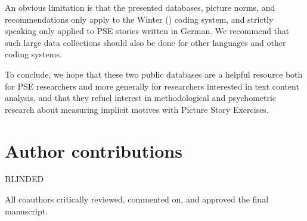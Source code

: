 \documentclass[man,a4paper,mask]{apa6}\usepackage[]{graphicx}\usepackage[]{color}
\begin{document}
An obvious limitation is that the presented databases, picture norms, and recommendations only apply to the Winter (\citeyear{winter_ManualScoringMotive_1994}) coding system, and strictly speaking only applied to PSE stories written in German. We recommend that such large data collections should also be done for other languages and other coding systems.

To conclude, we hope that these two public databases are a helpful resource both for PSE researchers and more generally for researchers interested in text content analysis, and that they refuel interest in methodological and psychometric research about measuring implicit motives with Picture Story Exercises.

\section{Author contributions}

BLINDED

All coauthors critically reviewed, commented on, and approved the final manuscript.


\printbibliography
\end{document}
